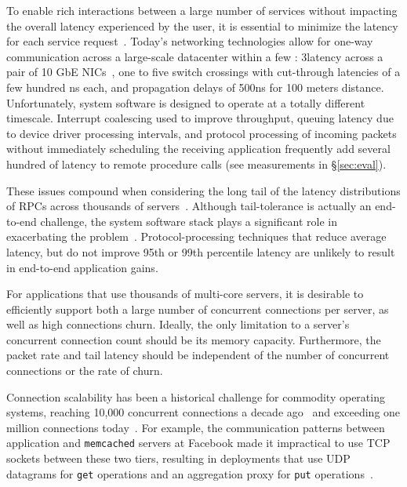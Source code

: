  To enable rich interactions
between a large number of services
without impacting the overall latency experienced by the user, it is essential
to minimize the latency for each service
request~\cite{luiz-isscc,DBLP:conf/hotos/RumbleOSRO11}. Today's networking technologies
allow for one-way communication across a large-scale datacenter within
a few \microsecond: 3\microsecond latency across a pair of 10 GbE
NICs~\cite{cisco-sereno}, one to five switch crossings with
cut-through latencies of a few hundred ns each, and propagation delays
of 500ns for 100 meters distance. Unfortunately, system software is
designed to operate at a totally different timescale. Interrupt
coalescing used to improve throughput, queuing latency due to device
driver processing intervals, and protocol processing of incoming
packets without immediately scheduling the receiving application
frequently add several hundred \microsecond of latency to remote
procedure calls (see measurements in \S\ref{sec:eval}).


These issues compound when considering the long tail of the latency
distributions of RPCs across thousands of
servers~\cite{DBLP:journals/cacm/DeanB13}. Although tail-tolerance is
actually an end-to-end challenge, the system software stack plays a
significant role in exacerbating the
problem~\cite{DBLP:conf/eurosys/LeverichK14}.  Protocol-processing techniques
that reduce average latency, but do not improve 95th or 99th
percentile latency are unlikely to result in end-to-end application
gains.

 For applications that use
thousands of multi-core servers, it is desirable to efficiently
support both a large number of concurrent connections per server, as
well as high connections churn.  Ideally, the only limitation to a
server's concurrent connection count should be its memory
capacity. Furthermore, the packet rate and tail latency should be
independent of the number of concurrent connections or the rate of
churn.
 
Connection scalability has been a historical challenge for commodity
operating systems, reaching 10,000 concurrent connections a decade
ago~\cite{theC10Kproblem} and exceeding one million connections
today~\cite{theC10Mproblem}.  For example, the communication patterns
between application and \texttt{memcached} servers at Facebook made it
impractical to use TCP sockets between these two tiers, resulting in
deployments that use UDP datagrams for \texttt{get} operations and an
aggregation proxy for \texttt{put}
operations~\cite{DBLP:conf/nsdi/NishtalaFGKLLMPPSSTV13}. 

